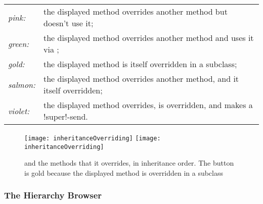 \documentclass[a4paper,10pt,twoside]{book}
\begin{document}


\begin{tabular}{lp{9cm}}
	\emph{pink:} & the displayed method overrides another method but doesn't use it;\\
	\emph{green:} & the displayed method overrides another method and uses it via \super;\\
	\emph{gold:} & the displayed method is itself overridden in a subclass;\\
	\emph{salmon:} & the displayed method overrides another method, and it itself overridden;\\
	\emph{violet:} & the displayed method overrides, is overridden, and makes a \ct!super!-send.
\end{tabular}

\begin{figure}[tbp]
	\begin{center}
   \ifluluelse
		{\texttt{[image: inheritanceOverriding]}}
		{\texttt{[image: inheritanceOverriding]}}
	\end{center}
	\caption{ and the methods that it overrides, in inheritance order. 
	The  button is gold because the displayed method is overridden in a subclass}
	\label{fig:inheritanceOverriding}
\end{figure}


\subsubsection{The Hierarchy Browser}
\label{sec:hierarchy}
\end{document}
